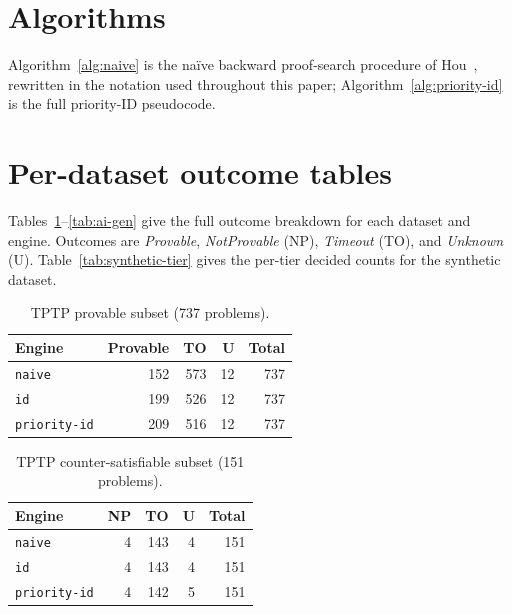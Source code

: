 \appendix

\section{Algorithms}\label{app:algorithms}

Algorithm~\ref{alg:naive} is the na\"ive backward proof-search procedure
of Hou~\cite[Algorithm~2, p.~67]{hou2021fundamentals}, rewritten in the
notation used throughout this paper; Algorithm~\ref{alg:priority-id} is
the full priority-ID pseudocode.





\FloatBarrier
\section{Per-dataset outcome tables}\label{app:tables}

Tables~\ref{tab:tptp-provable}--\ref{tab:ai-gen} give the full outcome
breakdown for each dataset and engine. Outcomes are \textit{Provable},
\textit{NotProvable} (NP), \textit{Timeout} (TO), and
\textit{Unknown} (U). Table~\ref{tab:synthetic-tier} gives the per-tier
decided counts for the synthetic dataset.

\begin{table}[h]
  \centering
  \caption{TPTP provable subset (737 problems).}
  \label{tab:tptp-provable}
  \begin{tabular}{lrrrr}
    \toprule
    Engine & Provable & TO & U & Total \\
    \midrule
    \texttt{naive}       & 152 & 573 & 12 & 737 \\
    \texttt{id}          & 199 & 526 & 12 & 737 \\
    \texttt{priority-id} & 209 & 516 & 12 & 737 \\
    \bottomrule
  \end{tabular}
\end{table}

\begin{table}[h]
  \centering
  \caption{TPTP counter-satisfiable subset (151 problems).}
  \label{tab:tptp-unprovable}
  \begin{tabular}{lrrrr}
    \toprule
    Engine & NP & TO & U & Total \\
    \midrule
    \texttt{naive}       & 4 & 143 & 4 & 151 \\
    \texttt{id}          & 4 & 143 & 4 & 151 \\
    \texttt{priority-id} & 4 & 142 & 5 & 151 \\
    \bottomrule
  \end{tabular}
\end{table}

